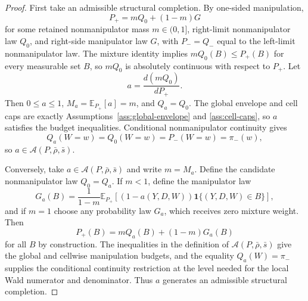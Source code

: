 \documentclass[11pt]{article}
\newcommand{\E}{\mathbb{E}}
\newcommand{\one}{\mathbf{1}}
\theoremstyle{definition}
\theoremstyle{plain}
\theoremstyle{remark}
\begin{document}
\begin{proof}
First take an admissible structural completion.  By one-sided manipulation,
\[
  P_+ = m Q_0 + (1-m)G
\]
for some retained nonmanipulator mass \(m\in(0,1]\), right-limit nonmanipulator law
\(Q_0\), and right-side manipulator law \(G\), with \(P_-=Q_-\) equal to the left-limit
nonmanipulator law.  The mixture identity implies \(mQ_0(B)\le P_+(B)\) for every
measurable set \(B\), so \(mQ_0\) is absolutely continuous with respect to \(P_+\).  Let
\[
  a=\frac{d(mQ_0)}{dP_+}.
\]
Then \(0\le a\le1\), \(M_a=\E_{P_+}[a]=m\), and \(Q_a=Q_0\).  The global envelope and
cell caps are exactly Assumptions~\ref{ass:global-envelope} and \ref{ass:cell-caps}, so
\(a\) satisfies the budget inequalities.  Conditional nonmanipulator continuity gives
\[
  Q_a(W=w)=Q_0(W=w)=P_-(W=w)=\pi_-(w),
\]
so \(a\in\mathcal A(P,\bar\rho,\bar s)\).

Conversely, take \(a\in\mathcal A(P,\bar\rho,\bar s)\) and write \(m=M_a\).  Define the
candidate nonmanipulator law \(Q_0=Q_a\).  If \(m<1\), define the manipulator law
\[
  G_a(B)=\frac{1}{1-m}\E_{P_+}[(1-a(Y,D,W))\one\{(Y,D,W)\in B\}],
\]
and if \(m=1\) choose any probability law \(G_a\), which receives zero mixture weight.
Then
\[
  P_+(B)=mQ_a(B)+(1-m)G_a(B)
\]
for all \(B\) by construction.  The inequalities in the definition of
\(\mathcal A(P,\bar\rho,\bar s)\) give the global and cellwise manipulation budgets, and
the equality \(Q_a(W)=\pi_-\) supplies the conditional continuity restriction at the level
needed for the local Wald numerator and denominator.  Thus \(a\) generates an admissible
structural completion.
\end{proof}
\end{document}
